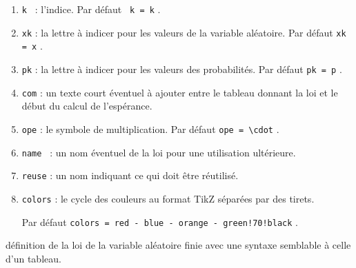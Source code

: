 \documentclass[12pt,a4paper]{article}
\begin{document}
\begin{enumerate}
    \item \verb#k # : l'indice.
		  \hfill
		  Par défaut \verb# k = k# .\verb#      #

    \item \verb#xk# : la lettre à indicer pour les valeurs de la variable aléatoire.
		  \hfill
		  Par défaut \verb#xk = x# .\verb#      #

    \item \verb#pk# : la lettre à indicer pour les valeurs des probabilités.
		  \hfill
		  Par défaut \verb#pk = p# .\verb#      #


    \medskip

    \item \verb#com# : un texte court éventuel à ajouter entre le tableau donnant la loi et le début du calcul de l'espérance.


    \medskip

    \item \verb#ope# : le symbole de multiplication.
		  \hfill
		  Par défaut \verb#ope = \cdot# .


    \medskip

    \item \verb#name # : un nom éventuel de la loi pour une utilisation ultérieure.

    \item \verb#reuse# : un nom indiquant ce qui doit être réutilisé.


    \medskip

    \item \verb#colors# : le cycle des couleurs au format TikZ séparées par des tirets.
		  
		  \smallskip
		  
		  \hfill
		  Par défaut \verb#colors = red - blue - orange - green!70!black# .
\end{enumerate}
%
%
\IDarg{} définition de la loi de la variable aléatoire finie avec une syntaxe semblable à celle d'un tableau.
\end{document}
